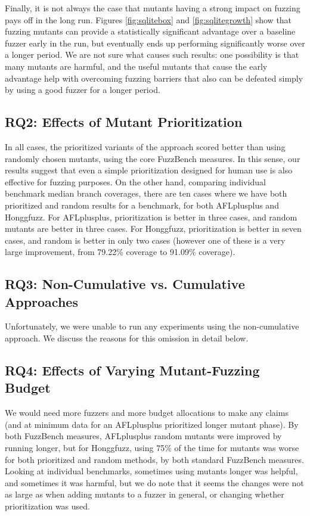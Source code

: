 Finally, it is not always the case that mutants having a strong impact on fuzzing pays off in the long run.  Figures \ref{fig:sqlitebox} and \ref{fig:sqlitegrowth} show that fuzzing mutants can provide a statistically significant advantage over a baseline fuzzer early in the run, but eventually ends up performing significantly worse over a longer period.  We are not sure what causes such results: one possibility is that many mutants are harmful, and the useful mutants that cause the early advantage help with overcoming fuzzing barriers that also can be defeated simply by using a good fuzzer for a longer period.

 \subsection{RQ2: Effects of Mutant Prioritization}

In all cases, the prioritized variants of the approach scored better than using randomly chosen mutants, using the core FuzzBench measures.  In this sense, our results suggest that even a simple prioritization designed for human use is also effective for fuzzing purposes.  On the other hand, comparing individual benchmark median branch coverages, there are ten cases where we have both prioritized and random results for a benchmark, for both AFLplusplus and Honggfuzz.  For AFLplusplus, prioritization is better in three cases, and random mutants are better in three cases.  For Honggfuzz, prioritization is better in seven cases, and random is better in only two cases (however one of these is a very large improvement, from 79.22\% coverage to 91.09\% coverage).

\subsection{RQ3: Non-Cumulative vs. Cumulative Approaches}

Unfortunately, we were unable to run any experiments using the non-cumulative approach.  We discuss the reasons for this omission in detail below.

\subsection{RQ4: Effects of Varying Mutant-Fuzzing Budget}

We would need more fuzzers and more budget allocations to make any claims (and at minimum data for an AFLplusplus prioritized longer mutant phase).  By both FuzzBench measures, AFLplusplus random mutants were improved by running longer, but for Honggfuzz, using 75\%  of the time for mutants was worse for both prioritized and random methods, by both standard FuzzBench measures.  Looking at individual benchmarks, sometimes using mutants longer was helpful, and sometimes it was harmful, but we do note that it seems the changes were not as large as when adding mutants to a fuzzer in general, or changing whether prioritization was used.

